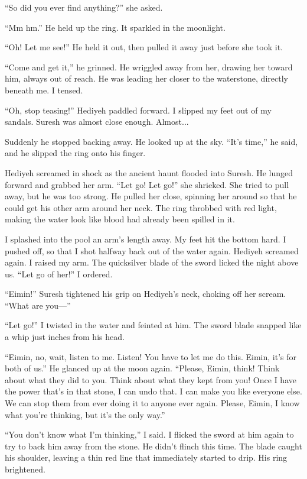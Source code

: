 ``So did you ever find anything?''  she asked.

``Mm hm.''  He held up the ring.  It sparkled in the moonlight.

``Oh! Let me see!''  He held it out, then pulled it away just before she
took it.

``Come and get it,'' he grinned.  He wriggled away from her, drawing her
toward him, always out of reach.  He was leading her closer to the
waterstone, directly beneath me.  I tensed.

``Oh, stop teasing!''  Hediyeh paddled forward.  I slipped my feet out
of my sandals.  Suresh was almost close enough.  Almost...

Suddenly he stopped backing away.  He looked up at the sky.  ``It's
time,'' he said, and he slipped the ring onto his finger.

Hediyeh screamed in shock as the ancient haunt flooded into Suresh.
He lunged forward and grabbed her arm.  ``Let go! Let go!''  she
shrieked.  She tried to pull away, but he was too strong.  He pulled
her close, spinning her around so that he could get his other arm
around her neck.  The ring throbbed with red light, making the water
look like blood had already been spilled in it.

I splashed into the pool an arm's length away.  My feet hit the bottom
hard.  I pushed off, so that I shot halfway back out of the water
again.  Hediyeh screamed again.  I raised my arm.  The quicksilver
blade of the sword licked the night above us.  ``Let go of her!''  I
ordered.

``Eimin!''  Suresh tightened his grip on Hediyeh's neck, choking off her
scream.  ``What are you---''

``Let go!''  I twisted in the water and feinted at him.  The sword blade
snapped like a whip just inches from his head.

``Eimin, no, wait, listen to me.  Listen! You have to let me do this.
Eimin, it's for both of us.''  He glanced up at the moon again.
``Please, Eimin, think! Think about what they did to you.  Think about
what they kept from you! Once I have the power that's in that stone, I
can undo that.  I can make you like everyone else.  We can stop them
from ever doing it to anyone ever again.  Please, Eimin, I know what
you're thinking, but it's the only way.''

``You don't know what I'm thinking,'' I said.  I flicked the sword at
him again to try to back him away from the stone.  He didn't flinch
this time.  The blade caught his shoulder, leaving a thin red line
that immediately started to drip.  His ring brightened.

